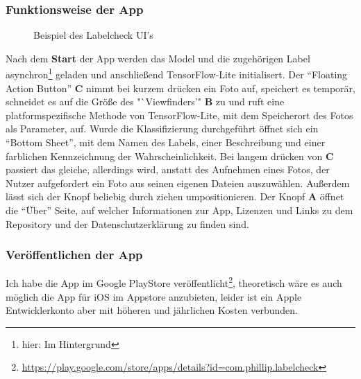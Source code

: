 \subsubsection{Funktionsweise der App}

\setlength{\belowcaptionskip}{-10pt}
\begin{wrapfigure}{r}{55mm}
  \caption[]{Beispiel des Labelcheck UI's}
  \label{screenshot}
\end{wrapfigure}
\setlength{\belowcaptionskip}{0pt}

Nach dem \textbf{Start} der App werden das Model und die zugehörigen Label asynchron\footnote{hier: Im Hintergrund} geladen und anschließend TensorFlow-Lite initialisert. Der "`Floating Action Button"' \textbf{C} nimmt bei kurzem drücken ein Foto auf, speichert es temporär, schneidet es auf die Größe des "`Viewfinders'" \textbf{B} zu und ruft eine platformspezifische Methode von TensorFlow-Lite, mit dem Speicherort des Fotos als Parameter, auf. Wurde die Klassifizierung durchgeführt öffnet sich ein "`Bottom Sheet"', mit dem Namen des Labels, einer Beschreibung und einer farblichen Kennzeichnung der Wahrscheinlichkeit. Bei langem drücken von \textbf{C} passiert das gleiche, allerdings wird, anstatt des Aufnehmen eines Fotos, der Nutzer aufgefordert ein Foto aus seinen eigenen Dateien auszuwählen. Außerdem lässt sich der Knopf beliebig durch ziehen umpositionieren. Der Knopf \textbf{A} öffnet die "`Über"' Seite, auf welcher Informationen zur App, Lizenzen und Links zu dem Repository und der Datenschutzerklärung zu finden sind.

\subsubsection{Veröffentlichen der App}

Ich habe die App im Google PlayStore veröffentlicht\footnote{\url{https://play.google.com/store/apps/details?id=com.phillip.labelcheck}}, theoretisch wäre es auch möglich die App für iOS im Appstore anzubieten, leider ist ein Apple Entwicklerkonto aber mit höheren und jährlichen Kosten verbunden.

